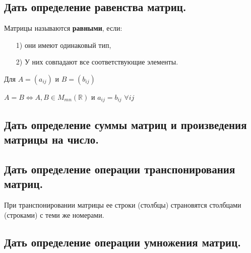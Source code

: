 \subsection{Дать определение равенства матриц.}

Матрицы называются {\bf{равными}}, если:
\begin{enumerate}
    \item[1)] они имеют одинаковый тип,
    \item[2)] У них совпадают все соответствующие элементы.
\end{enumerate}

 \begin{center} 
    Для $A = (a_{ij})$ и $B = (b_{ij})$
 
    $A = B \iff A, B \in M_{mn}(\mathbb{R})$ и $a_{ij} = b_{ij}$ $\forall ij$  
\end{center}



\subsection{Дать определение суммы матриц и произведения матрицы на число.}


\vspace*{15pt}


\subsection{Дать определение операции транспонирования матриц.}


При транспонировании матрицы ее строки (столбцы) страновятся столбцами (строками) с теми же номерами.

\subsection{Дать определение операции умножения матриц.}

